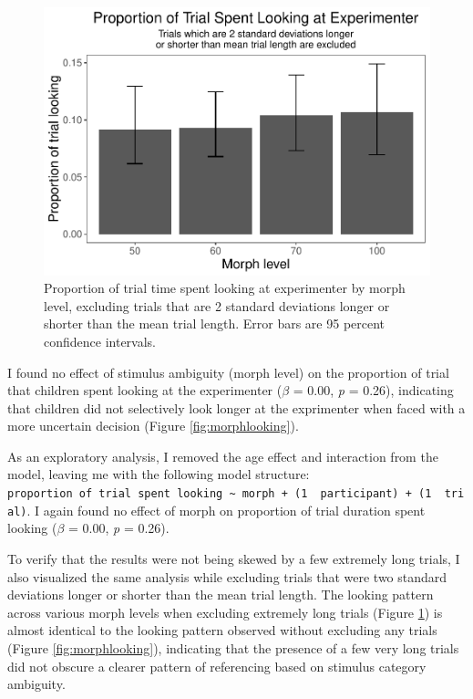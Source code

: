 \documentclass[,man,floatsintext]{apa6}
\begin{document}
\begin{figure}
\centering
\includegraphics{soc_ref_category_paper_files/figure-latex/morphlookingtrimmed-1.pdf}
\caption{\label{fig:morphlookingtrimmed}Proportion of trial time spent looking at experimenter by morph level, excluding trials that are 2 standard deviations longer or shorter than the mean trial length. Error bars are 95 percent confidence intervals.}
\end{figure}

I found no effect of stimulus ambiguity (morph level) on the proportion of trial that children spent looking at the experimenter (\(\beta\) = 0.00, \emph{p} = 0.26), indicating that children did not selectively look longer at the exprimenter when faced with a more uncertain decision (Figure \ref{fig:morphlooking}).

As an exploratory analysis, I removed the age effect and interaction from the model, leaving me with the following model structure: \texttt{proportion\ of\ trial\ spent\ looking\ \textasciitilde{}\ morph\ +\ (1\ \textbar{}\ participant)\ +\ (1\ \textbar{}\ trial)}. I again found no effect of morph on proportion of trial duration spent looking (\(\beta\) = 0.00, \emph{p} = 0.26).

To verify that the results were not being skewed by a few extremely long trials, I also visualized the same analysis while excluding trials that were two standard deviations longer or shorter than the mean trial length. The looking pattern across various morph levels when excluding extremely long trials (Figure \ref{fig:morphlookingtrimmed}) is almost identical to the looking pattern observed without excluding any trials (Figure \ref{fig:morphlooking}), indicating that the presence of a few very long trials did not obscure a clearer pattern of referencing based on stimulus category ambiguity.
\end{document}
